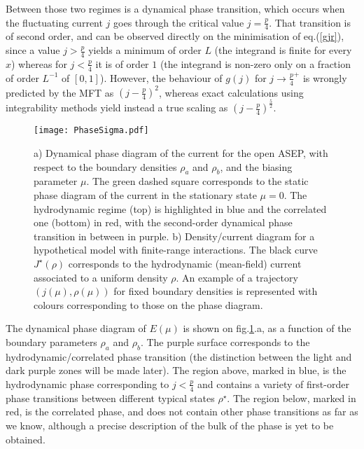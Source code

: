 \documentclass[aps,pre,onecolumn,showpacs,showkeys,a4paper]{revtex4-1}
\begin{document}
Between those two regimes is a dynamical phase transition, which occurs when the fluctuating current $j$ goes through the critical value $j=\frac{p}{4}$. That transition is of second order, and can be observed directly on the minimisation of eq.(\ref{gjr}), since a value $j>\frac{p}{4}$ yields a minimum of order $L$ (the integrand is finite for every $x$) whereas for $j<\frac{p}{4}$ it is of order $1$ (the integrand is non-zero only on a fraction of order $L^{-1}$ of $[0,1]$). However, the behaviour of $g(j)$ for $j\rightarrow \frac{p}{4}^+$ is wrongly predicted by the MFT as $(j-\frac{p}{4})^2$, whereas exact calculations using integrability methods \cite{Lazarescu2014,Lazarescu2015} yield instead a true scaling as $(j-\frac{p}{4})^{\frac{5}{2}}$.
 \begin{figure}[ht]
\begin{center}
 \texttt{[image: PhaseSigma.pdf]}
  \caption{a) Dynamical phase diagram of the current for the open ASEP, with respect to the boundary densities $\rho_a$ and $\rho_b$, and the biasing parameter $\mu$. The green dashed square corresponds to the static phase diagram of the current in the stationary state $\mu=0$. The hydrodynamic regime (top) is highlighted in blue and the correlated one (bottom) in red, with the second-order dynamical phase transition in between in purple. \newline b) Density/current diagram for a hypothetical model with finite-range interactions. The black curve $J^\star(\rho)$ corresponds to the hydrodynamic (mean-field) current associated to a uniform density $\rho$. An example of a trajectory $(j(\mu),\rho(\mu))$ for fixed boundary densities is represented with colours corresponding to those on the phase diagram.}
\label{fig-PhaseSigma}
 \end{center}
 \end{figure}

The dynamical phase diagram of $E(\mu)$ is shown on fig.\ref{fig-PhaseSigma}.a, as a function of the boundary parameters $\rho_a$ and $\rho_b$. The purple surface corresponds to the hydrodynamic/correlated phase transition (the distinction between the light and dark purple zones will be made later). The region above, marked in blue, is the hydrodynamic phase corresponding to $j<\frac{p}{4}$ and contains a variety of first-order phase transitions between different typical states $\rho^\star$. The region below, marked in red, is the correlated phase, and does not contain other phase transitions as far as we know, although a precise description of the bulk of the phase is yet to be obtained.
\end{document}
